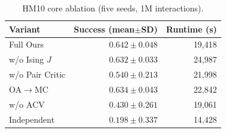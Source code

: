 \begin{table}[t]\centering\small\caption{HM10 core ablation (five seeds, 1M interactions).}\label{tab:hmabl}\begin{tabular}{lrr}\toprule Variant & Success (mean$\pm$SD) & Runtime (s)\\\midrule
Full Ours & $0.642\pm0.048$ & 19,418\\ w/o Ising $J$ & $0.632\pm0.033$ & 24,987\\ w/o Pair Critic & $0.540\pm0.213$ & 21,998\\ OA$\rightarrow$MC & $0.634\pm0.043$ & 22,842\\ w/o ACV & $0.430\pm0.261$ & 19,061\\ Independent & $0.198\pm0.337$ & 14,428\\\bottomrule\end{tabular}\end{table}
